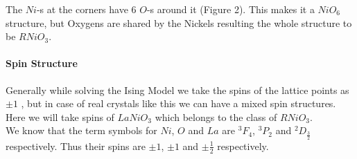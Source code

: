 \documentclass[20pt]{article}
\begin{document}
The $Ni$-s at the corners have 6 $O$-s around it (Figure 2). This makes it a $NiO_6$ structure, but Oxygens are shared by the Nickels resulting the whole structure to be $RNiO_3$.\\

\paragraph*{Spin Structure\\}
Generally while solving the Ising Model we take the spins of the lattice points as $\pm1$ , but in case of real crystals like this we can have a mixed spin structures. Here we will take spins of $LaNiO_3$ which belongs to the class of $RNiO_3$.\\
We know that the term symbols for $Ni$, $O$ and $La$ are $^3F_4$, $^3P_2$ and  $^2D_{\frac{3}{2}}$ respectively. Thus their spins are $\pm 1$, $\pm 1$ and $\pm\frac{1}{2}$ respectively. 
\end{document}
